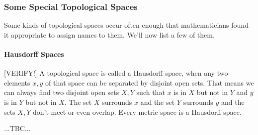 
\subsubsection{Some Special Topological Spaces}
Some kinds of topological spaces occur often enough that mathematicians found it appropriate to assign names to them. We'll now list a few of them.

\paragraph{Hausdorff Spaces} [VERIFY!] A topological space is called a Hausdorff space, when any two elements $x,y$ of that space can be separated by disjoint open sets. That means we can always find two disjoint open sets $X,Y$ such that $x$ is in $X$ but not in $Y$ and $y$ is in $Y$ but not in $X$. The set $X$ surrounds $x$ and the set $Y$ surrounds $y$ and the sets $X,Y$ don't meet or even overlap. Every metric space is a Hausdorff space.

...TBC...



\begin{comment}

Zusammenhang zwischen normierten, metrischen und topologischen Räumen
https://www.youtube.com/watch?v=3j8GIJd5-3A&list=PLHi0WgifODX19zsJhvCrizYEXiHY5qc9n

Definition of closeness or neighborhood: two elements $x,y$ of $X$ are close to each other iff there exists an open set that contains both $x$ and $y$

A topology is a collection of open sets.



\end{comment}